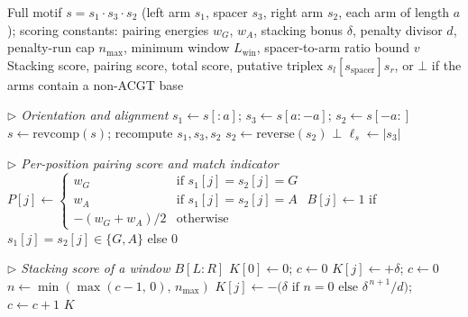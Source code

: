 \documentclass{article}
\begin{document}
\begin{algorithm}
\caption{HSeeker Phase 3: Thermodynamic Stability Scoring}
\label{alg:mirror-phase3}
\scriptsize
\begin{algorithmic}[1]
\Require Full motif $s = s_1 \cdot s_3 \cdot s_2$ (left arm $s_1$, spacer $s_3$,
         right arm $s_2$, each arm of length $a$);
         scoring constants: pairing energies $w_G$, $w_A$, stacking bonus $\delta$,
         penalty divisor $d$, penalty-run cap $n_{\max}$,
         minimum window $L_{\mathrm{win}}$, spacer-to-arm ratio bound $v$
\Ensure Stacking score, pairing score, total score, putative triplex
        $s_l[s_{\mathrm{spacer}}]s_r$, or $\bot$ if the arms contain a non-ACGT base

\Statex \textit{$\triangleright$ Orientation and alignment}
\State $s_1 \leftarrow s[{:}a]$;\; $s_3 \leftarrow s[a{:}-a]$;\; $s_2 \leftarrow s[-a{:}]$
    \State $s \leftarrow \mathrm{revcomp}(s)$; recompute $s_1, s_3, s_2$
\EndIf
\State $s_2 \leftarrow \mathrm{reverse}(s_2)$
 \State \Return $\bot$ \EndIf
\State $\ell_s \leftarrow |s_3|$

\Statex \textit{$\triangleright$ Per-position pairing score and match indicator}
    \State $P[j] \leftarrow
        \begin{cases}
            w_G   & \text{if } s_1[j] = s_2[j] = G\\
            w_A   & \text{if } s_1[j] = s_2[j] = A\\
            -(w_G + w_A)/2 & \text{otherwise}
        \end{cases}$
    \State $B[j] \leftarrow 1$ if $s_1[j] = s_2[j] \in \{G,A\}$ else $0$
\EndFor

\Statex \textit{$\triangleright$ Stacking score of a window $B[L{:}R]$}
    \State $K[0] \leftarrow 0$;\; $c \leftarrow 0$
            \State $K[j] \leftarrow +\delta$;\; $c \leftarrow 0$
        \Else
            \State $n \leftarrow \min(\max(c - 1,\, 0),\, n_{\max})$
            \State $K[j] \leftarrow -\bigl(\delta \text{ if } n = 0 \text{ else }
                   \delta^{\,n+1}/d\bigr)$;\; $c \leftarrow c + 1$
        \EndIf
    \EndFor
    \State \Return $K$
\EndProcedure


\end{algorithmic}
\end{algorithm}
\end{document}
